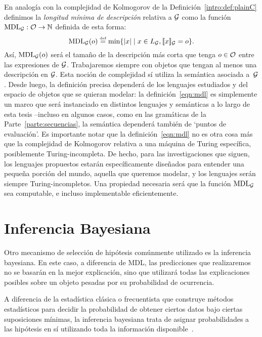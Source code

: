 En analogía con la complejidad de Kolmogorov de la Definición~\ref{intro:def:plainC} definimos la {\em longitud mínima de descripción} relativa a $\gram$ como la función $\mdl{\gram}:\+O\to\nat$ definida de esta forma:
%
\begin{equation}\label{eqn:mdl}
\mdl{\gram}(o)\eqdef\min\{|x|\mid x\in L_\gram,\sem{x}_{\gram}=o\}.
\end{equation}
%
Así, $\mdl{\gram}(o)$ será el tamaño de la descripción más corta que tenga $o\in\+O$ entre las expresiones de $\gram$. Trabajaremos siempre con objetos que tengan al menos una descripción en $\gram$. Esta noción de complejidad sí utiliza la semántica asociada a~$\gram$. Desde luego, la definición precisa dependerá de los lenguajes estudiados y del espacio de objetos que se quieran modelar: la definición~\eqref{eqn:mdl} es simplemente un marco que será instanciado en distintos lenguajes y semánticas a lo largo de esta tesis --incluso en algunos casos, como en las gramáticas de la Parte~\ref{parte:secuencias}, la semántica dependerá también de `puntos de evaluación'. Es importante notar que la definición~\eqref{eqn:mdl} no es otra cosa más que la complejidad de Kolmogorov relativa a una máquina de Turing específica, posiblemente Turing-incompleta. De hecho, para las investigaciones que siguen, los lenguajes propuestos estarán específicamente diseñados para entender una pequeña porción del mundo, aquella que queremos modelar, y los lenguajes serán siempre Turing-incompletos. Una propiedad necesaria será que la función $\mdl{\gram}$ sea computable, e incluso implementable eficientemente.





\section{Inferencia Bayesiana}\label{sec:bayes}
Otro mecanismo de selección de hipótesis comúnmente utilizado es la inferencia bayesiana. En este caso, a diferencia de MDL, las predicciones que realizaremos no se basarán en la mejor explicación, sino que utilizará todas las explicaciones posibles sobre un objeto pesadas por su probabilidad de ocurrencia. 

A diferencia de la estadística clásica o frecuentista que construye métodos estadísticos para decidir la probabilidad de obtener ciertos datos bajo ciertas suposiciones mínimas, la inferencia bayesiana trata de asignar probabilidades a las hipótesis en sí utilizando toda la información disponible~\cite{carlin2008bayesian}.

